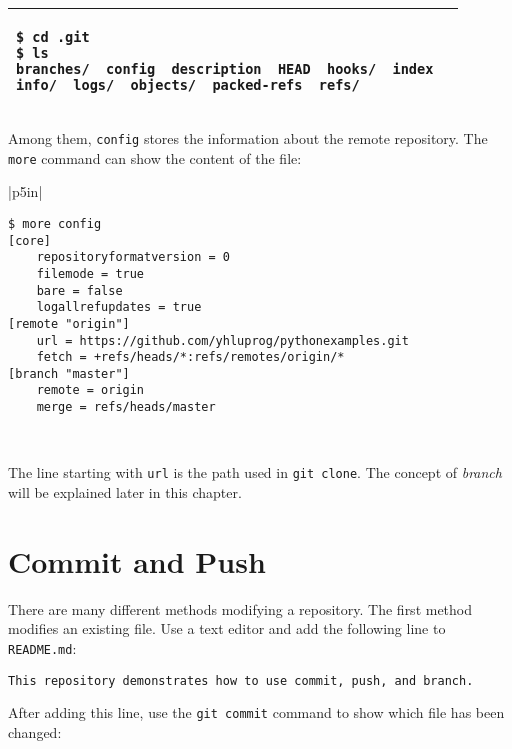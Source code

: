 \vspace{0.2in}

\noindent
\begin{tabular}{|p{5in}|}\hline
\begin{verbatim}
$ cd .git
$ ls
branches/  config  description	HEAD  hooks/  index  
info/  logs/  objects/  packed-refs  refs/
\end{verbatim}
\\ \hline
\end{tabular}
\vspace{0.2in}


Among them, {\tt config} stores the information about
the remote repository.  The {\tt more} command can show
the content of the file:

\vspace{0.2in}

\noindent
\begin{tabular}{|p{5in}|}\hline
\begin{verbatim}
$ more config
[core]
	repositoryformatversion = 0
	filemode = true
	bare = false
	logallrefupdates = true
[remote "origin"]
	url = https://github.com/yhluprog/pythonexamples.git
	fetch = +refs/heads/*:refs/remotes/origin/*
[branch "master"]
	remote = origin
	merge = refs/heads/master
\end{verbatim}
\\ \hline
\end{tabular}
\vspace{0.2in}

The line starting with {\tt url} is the path used in {\tt git clone}.
The concept of {\it branch} will be explained later in this chapter.

\section{Commit and Push}


There are many different methods modifying a repository.  The first
method modifies an existing file.  Use a text editor and add the
following line to {\tt README.md}:

\begin{verbatim}
This repository demonstrates how to use commit, push, and branch.
\end{verbatim}

After adding this line, use the {\tt git commit} command to show which file
has been changed:

